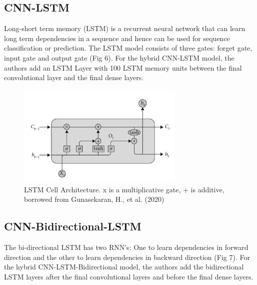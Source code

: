 \documentclass[journal]{IEEEtran}
\begin{document}
  \subsection{CNN-LSTM}
    Long-short term memory (LSTM) is a recurrent neural network that can learn long term dependencies in a sequence and 
    hence can be used for sequence classification or prediction. The LSTM model consists of three gates: forget gate, input gate and output gate (Fig 6).
    For the hybrid CNN-LSTM model, the authors add an LSTM Layer with 100 LSTM memory units
    between the final convolutional layer and the final dense layers.
    
    \begin{figure}
      \centering
      \includegraphics[width=8cm]{figures/lstm_cell.png}
      \caption{LSTM Cell Architecture. x is a multiplicative gate, + is additive, borrowed from Gunasekaran, H., et al. (2020)}
    \end{figure}



  \subsection{CNN-Bidirectional-LSTM}
    The bi-directional LSTM has two RNN’s: One to learn dependencies in forward direction and the other to 
    learn dependencies in backward direction (Fig 7). For the hybrid CNN-LSTM-Bidirectional model, the authors add the bidirectional LSTM layers
    after the final convolutional layers and before the final dense layers.
\end{document}
